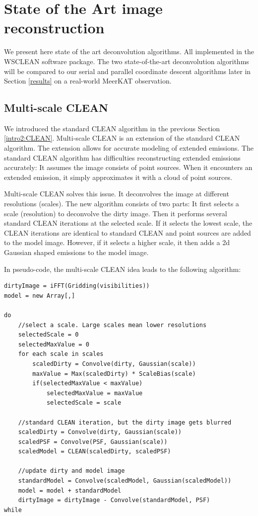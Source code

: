\section{State of the Art image reconstruction}\label{state}
We present here state of the art deconvolution algorithms.
All implemented in the WSCLEAN software package.
The two state-of-the-art deconvolution algorithms will be compared to our serial and parallel coordinate descent algorithms later in Section \ref{results} on a real-world MeerKAT observation.


\subsection{Multi-scale CLEAN}
We introduced the standard CLEAN algorithm in the previous Section \ref{intro2:CLEAN}.  Multi-scale CLEAN is an extension of the standard CLEAN algorithm. The extension allows for accurate modeling of extended emissions. The standard CLEAN algorithm has difficulties reconstructing extended emissions accurately: It assumes the image consists of point sources. When it encounters an extended emission, it simply approximates it with a cloud of point sources. 

Multi-scale CLEAN solves this issue. It deconvolves the image at different resolutions (scales). The new algorithm consists of two parts: It first selects a scale (resolution) to deconvolve the dirty image. Then it performs several standard CLEAN iterations at the selected scale. If it selects the lowest scale, the CLEAN iterations are identical to standard CLEAN and point sources are added to the model image. However, if it selects a higher scale, it then adds a 2d Gaussian shaped emissions to the model image.

In pseudo-code, the multi-scale CLEAN idea leads to the following algorithm:
\begin{lstlisting}
dirtyImage = iFFT(Gridding(visibilities))
model = new Array[,]

do
	//select a scale. Large scales mean lower resolutions
	selectedScale = 0
	selectedMaxValue = 0
	for each scale in scales
		scaledDirty = Convolve(dirty, Gaussian(scale))
		maxValue = Max(scaledDirty) * ScaleBias(scale)
		if(selectedMaxValue < maxValue)
			selectedMaxValue = maxValue
			selectedScale = scale
			
	//standard CLEAN iteration, but the dirty image gets blurred
	scaledDirty = Convolve(dirty, Gaussian(scale))
	scaledPSF = Convolve(PSF, Gaussian(scale))
	scaledModel = CLEAN(scaledDirty, scaledPSF)
	
	//update dirty and model image
	standardModel = Convolve(scaledModel, Gaussian(scaledModel))
	model = model + standardModel
	dirtyImage = dirtyImage - Convolve(standardModel, PSF)
while
\end{lstlisting}

